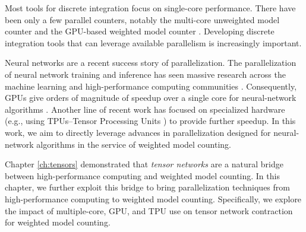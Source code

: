 Most tools for discrete integration focus on single-core performance. 
There have been only a few parallel counters, notably the multi-core unweighted model counter  \cite{BSB15} and the GPU-based weighted model counter  \cite{FHWZ18,FHZ19}.
Developing discrete integration tools that can leverage available parallelism is increasingly important. %


Neural networks are a recent success story of parallelization. The parallelization of neural network training and inference has seen massive research across the machine learning and high-performance computing communities \cite{ABCCDDDGII16,JYPPABBBBB17,PGMLJGKLGA19}. Consequently, GPUs give orders of magnitude of speedup over a single core for neural-network algorithms \cite{KSTKPPRS19,NRBHHJN15}. 
Another line of recent work has focused on specialized hardware (e.g., using TPUs--Tensor Processing Units \cite{JYPPABBBBB17}) to provide further speedup.
In this work, we aim to directly leverage advances in parallelization designed for neural-network algorithms in the service of weighted model counting. %

Chapter \ref{ch:tensors} demonstrated that \emph{tensor networks} are a natural bridge between high-performance computing and weighted model counting.
In this chapter, we further exploit this bridge to bring parallelization techniques from high-performance computing to weighted model counting. Specifically, we explore the impact of multiple-core, GPU, and TPU use on tensor network contraction for weighted model counting.

